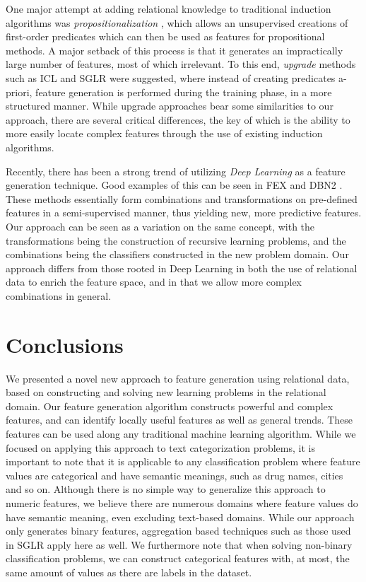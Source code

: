 \documentclass[twoside,11pt]{article}
\theoremstyle{definition}
\begin{document}
One major attempt at adding relational knowledge to traditional induction algorithms was \emph{propositionalization} \cite{kramer2000bottom}, which allows an unsupervised creations of first-order predicates which can then be used as features for propositional methods. A major setback of this process is that it generates an impractically large number of features, most of which irrelevant.  To this end, \emph{upgrade} methods such as ICL \cite{van2001upgrade} and SGLR \cite{popescul200716} were suggested, where instead of creating predicates a-priori, feature generation is performed during the training phase, in a more structured manner. While upgrade approaches bear some similarities to our approach, there are several critical differences, the key of which is the ability to more easily locate complex features through the use of existing induction algorithms.

Recently, there has been a strong trend of utilizing \emph{Deep Learning} \cite{lecun1998gradient,bengio2009learning} as a feature generation technique. Good examples of this can be seen in FEX \cite{plotz2011featurefull} and DBN2 \cite{kim2013deepfull}. These methods essentially form combinations and transformations on pre-defined features in a semi-supervised manner, thus yielding new, more predictive features. Our approach can be seen as a variation on the same concept, with the transformations being the construction of recursive learning problems, and the combinations being the classifiers constructed in the new problem domain. Our approach differs from those rooted in Deep Learning in both the use of relational data to enrich the feature space, and in that we allow more complex combinations in general.

\section{Conclusions}

We presented a novel new approach to feature generation using relational data, based on constructing and solving new learning problems in the relational domain. 
Our feature generation algorithm constructs powerful and complex features, and can identify locally useful features as well as general trends. These features can be used along any traditional machine learning algorithm.
While we focused on applying this approach to text categorization problems, it is important to note that it is applicable to any classification problem where feature values are categorical and have semantic meanings, such as drug names, cities and so on. Although there is no simple way to generalize this approach to numeric features, we believe there are numerous domains where feature values do have semantic meaning, even excluding text-based domains.
While our approach only generates binary features, aggregation based techniques such as those used in SGLR apply here as well. We furthermore note that when solving non-binary classification problems, we can construct categorical features with, at most, the same amount of values as there are labels in the dataset.
\end{document}
